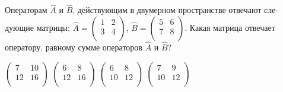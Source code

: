 \documentclass[11pt,a4paper]{exam}
\begin{document}
\begin{questions}
\question Операторам $\hat{A}$ и $\hat{B}$, действующим в двумерном пространстве отвечают сле-дующие матрицы: $\hat{A}=\left( \begin{matrix}
   1 & 2  \\
   3 & 4  \\
\end{matrix} \right)$, $\hat{B}=\left( \begin{matrix}
   5 & 6  \\
   7 & 8  \\
\end{matrix} \right)$. Какая матрица отвечает оператору, равному сумме операторов $\hat{A}$ и $\hat{B}$?
\begin{choices}
\choice $\left( \begin{matrix}
   7 & 10  \\
   12 & 16  \\
\end{matrix} \right)$      
\choice $\left( \begin{matrix}
   6 & 8  \\
   12 & 16  \\
\end{matrix} \right)$      
\choice $\left( \begin{matrix}
   6 & 8  \\
   10 & 12  \\
\end{matrix} \right)$      
\choice $\left( \begin{matrix}
   7 & 9  \\
   10 & 12  \\
\end{matrix} \right)$
\end{choices}


\end{questions}
\end{document}
